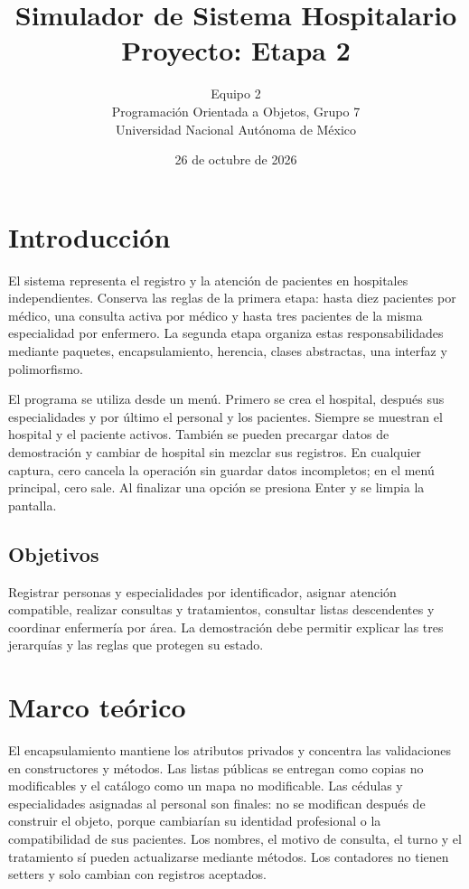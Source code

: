\documentclass[letterpaper,12pt,oneside]{article}
\title{Simulador de Sistema Hospitalario\\Proyecto: Etapa 2}
\author{Equipo 2\\Programación Orientada a Objetos, Grupo 7\\Universidad Nacional Autónoma de México}
\date{26 de octubre de 2026}
\begin{document}
\maketitle\thispagestyle{empty}\clearpage
\tableofcontents\clearpage
\section{Introducción}
El sistema representa el registro y la atención de pacientes en hospitales independientes. Conserva las reglas de la primera etapa: hasta diez pacientes por médico, una consulta activa por médico y hasta tres pacientes de la misma especialidad por enfermero. La segunda etapa organiza estas responsabilidades mediante paquetes, encapsulamiento, herencia, clases abstractas, una interfaz y polimorfismo.

El programa se utiliza desde un menú. Primero se crea el hospital, después sus especialidades y por último el personal y los pacientes. Siempre se muestran el hospital y el paciente activos. También se pueden precargar datos de demostración y cambiar de hospital sin mezclar sus registros. En cualquier captura, cero cancela la operación sin guardar datos incompletos; en el menú principal, cero sale. Al finalizar una opción se presiona Enter y se limpia la pantalla.

\subsection{Objetivos}
Registrar personas y especialidades por identificador, asignar atención compatible, realizar consultas y tratamientos, consultar listas descendentes y coordinar enfermería por área. La demostración debe permitir explicar las tres jerarquías y las reglas que protegen su estado.

\section{Marco teórico}
El encapsulamiento mantiene los atributos privados y concentra las validaciones en constructores y métodos. Las listas públicas se entregan como copias no modificables y el catálogo como un mapa no modificable. Las cédulas y especialidades asignadas al personal son finales: no se modifican después de construir el objeto, porque cambiarían su identidad profesional o la compatibilidad de sus pacientes. Los nombres, el motivo de consulta, el turno y el tratamiento sí pueden actualizarse mediante métodos. Los contadores no tienen setters y solo cambian con registros aceptados.
\end{document}

